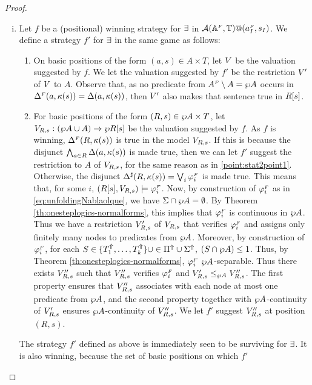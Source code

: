 \begin{proof}
\begin{enumerate}[(i)]
\item
Let $f$ be a (positional) winning strategy for $\exists$ in $\mathcal{A}
(\mathbb{A}^{{\scriptscriptstyle F}},\mathbb{T})@(a_I^{{\scriptscriptstyle F}},s_I)$.
We define a strategy $f'$ for $\exists$ in the same game as follows:
\begin{enumerate}[label=(\alph*),ref=\alph*]
\item On basic positions of the form $(a,s) \in A\times T$, let $V$ be the
  valuation suggested by $f$.
  We let the valuation suggested by $f'$ be the restriction $V'$ of $V$
  to $A$.
  Observe that, as no predicate from $A^{{\scriptscriptstyle F}}\setminus A =\wp A$ occurs in
  $\Delta^{{\scriptscriptstyle F}}(a,\kappa(s)) = \Delta(a,\kappa(s))$, then $V'$ also makes that
  sentence true in $R[s]$.
  \label{point:stat2point1}
\item For basic positions of the form $(R,s) \in \wp A \times T$, let 
  $V_{R,s}: (\wp A \cup A) \to \wp R[s]$ be the valuation suggested by $f$.
  As $f$ is winning, $\Delta^{{\scriptscriptstyle F}}(R,\kappa(s))$ is true in the model $V_{R,s}$.
  If this is because the disjunct $\bigwedge_{a \in R} \Delta(a,\kappa(s))$ is
  made true, then we can let $f'$ suggest the restriction to $A$ of $V_{R,s}$,
  for the same reason as in \eqref{point:stat2point1}.
  Otherwise, the disjunct $\Delta^{\sharp}(R,\kappa(s)) = \bigvee_{i}\varphi_i^{{\scriptscriptstyle F}}$ is made
  true.
  This means that, for some $i$, $(R[s], V_{R,s}) \models \varphi_i^{{\scriptscriptstyle F}}$.
  Now, by construction of $\varphi_i^{{\scriptscriptstyle F}}$ as in \eqref{eq:unfoldingNablaolque}, we have $\Sigma \cap
  \wp A = \emptyset$. By Theorem \ref{th:onesteplogics-normalforms},
  this implies that $\varphi_i^{{\scriptscriptstyle F}}$ is continuous in $\wp A$.
  Thus we have a restriction $V_{R,s}'$ of $V_{R,s}$ that verifies
  $\varphi_i^{{\scriptscriptstyle F}}$ and assigns only finitely many nodes to predicates from $\wp A$. Moreover, by construction of $\varphi_i^{{\scriptscriptstyle F}}$, for each $S \in \{T^{\Uparrow}_1,\dots,T^{\Uparrow}_k\}\cup \in \Pi^{\Uparrow} \cup \Sigma^{\Uparrow}$, $(S \cap \wp A) \leq 1$. Thus, by Theorem \ref{th:onesteplogics-normalforms}, $\varphi_i^{{\scriptscriptstyle F}}$ $\wp A$-separable. Thus there exists $V_{R,s}''$ such that $V_{R,s}''$ verifies
  $\varphi_i^{{\scriptscriptstyle F}}$ and $V_{R,s}' \leq_{\wp A} V_{R,s}''$. The first property ensures that $V_{R,s}''$ associates with each node at most one predicate from $\wp A$, and the second property together with $\wp A$-continuity of $V_{R,s}'$ ensures $\wp A$-continuity of $V_{R,s}''$. We let $f'$ suggest $V_{R,s}''$ at position $(R,s)$.
\end{enumerate}
The strategy $f'$ defined as above is immediately seen to be surviving for
$\exists$. It is also winning, because the set of basic positions on which $f'$

\end{enumerate}
\end{proof}
